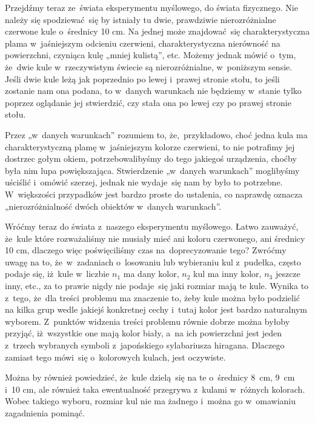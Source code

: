 \documentclass[a4paper,11pt]{article}
\numberwithin{equation}{section}
\begin{document}
Przejdźmy teraz ze~świata eksperymentu myślowego, do świata fizycznego. Nie
należy się spodziewać~się by istniały tu dwie, prawdziwie nierozróżnialne
czerwone kule o~średnicy 10 cm. Na jednej może znajdować~się
charakterystyczna plama w~jaśniejszym odcieniu czerwieni, charakterystyczna
nierówność na powierzchni, czyniąca kulę „mniej kulistą”, etc. Możemy jednak
mówić o~tym, że~dwie kule w~rzeczywistym świecie są nierozróżnialne,
w~poniższym sensie. Jeśli dwie kule leżą jak poprzednio po lewej i~prawej
stronie stołu, to jeśli zostanie nam ona podana, to w~danych warunkach nie
będziemy w~stanie tylko poprzez oglądanie jej stwierdzić, czy stała ona po
lewej czy po prawej stronie stołu.

Przez „w~danych warunkach” rozumiem to, że,~przykładowo, choć jedna kula ma
charakterystyczną plamę w~jaśniejszym kolorze czerwieni, to nie potrafimy
jej dostrzec gołym okiem, potrzebowalibyśmy do tego jakiegoś urządzenia,
choćby była nim lupa powiększająca. Stwierdzenie „w~danych warunkach”
moglibyśmy uściślić i~omówić szerzej, jednak nie wydaje~się nam by było to
potrzebne. W~większości przypadków jest bardzo proste do ustalenia, co
naprawdę oznacza „nierozróżnialność dwóch obiektów w~danych warunkach”.

Wróćmy teraz do świata z~naszego eksperymentu myślowego. Łatwo zauważyć,
że~kule które rozważaliśmy nie musiały mieć ani koloru czerwonego, ani
średnicy 10 cm, dlaczego więc poświęciliśmy czas na~doprecyzowanie tego?
Zwróćmy uwagę na to, że~w~zadaniach o~losowaniu lub wybieraniu kul
z~pudełka, często podaje się, iż~kule w~liczbie $n_{ 1 }$ ma dany kolor,
$n_{ 2 }$ kul ma inny kolor, $n_{ 3 }$ jeszcze inny, etc., za to prawie nigdy
nie podaje~się jaki rozmiar mają te kule. Wynika to z~tego, że~dla treści
problemu ma znaczenie to, żeby kule można było podzielić na kilka
grup wedle jakiejś konkretnej cechy i~tutaj kolor jest bardzo naturalnym
wyborem. Z~punktów widzenia treści problemu równie dobrze można byłoby
przyjąć, iż~wszystkie one mają kolor biały, a~na ich powierzchni jest jeden
z~trzech wybranych symboli z~japońskiego sylabariusza hiragana. Dlaczego
zamiast tego mówi~się o~kolorowych kulach, jest oczywiste.

Można by również powiedzieć, że~kule dzielą~się na te o~średnicy 8~cm, 9~cm
i~10 cm, ale również taka ewentualność przegrywa z~kulami w~różnych kolorach.
Wobec takiego wyboru, rozmiar kul nie ma żadnego i~można go w~omawianiu
zagadnienia pominąć.
\end{document}
